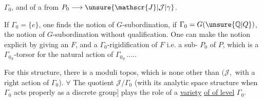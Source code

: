  $\Gamma_0$, and of a  from $P_0\longrightarrow\unsure{\mathscr{J}|\mathcal{J}|\gamma}$.

If $\Gamma_0=\{e\}$, one finds the notion of  $G$-subordination, if $\Gamma_0=G(\unsure{\mathbb{Q}|Q})$, the notion of $G$-subordination without qualification. One can make the notion explicit by giving an $F$, and a  $\Gamma_0$-rigidification of $F$ i.e. a sub- $P_0$ of $P$, which is a  $\Gamma_{0_S}$-torsor for the natural action of $\Gamma_{0_S}$\,.....

For this structure, there is a moduli topos, which is none other than  $(\mathscr{J},$ with a right action of $\Gamma_0$). $\forall$ The quotient $\mathscr{J}/\Gamma_0$ (with its analytic space structure when $\Gamma_0$ acts properly as a discrete group]  plays the role of a \uline{variety} \uline{of } \uline{of level} $\Gamma_0$.

